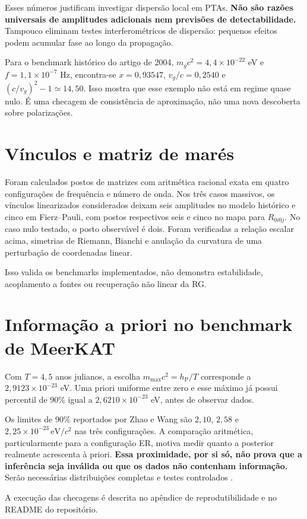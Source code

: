 Esses números justificam investigar dispersão local em PTAs. \textbf{Não
são razões universais de amplitudes adicionais nem previsões de
detectabilidade.} Tampouco eliminam testes interferométricos de
dispersão: pequenos efeitos podem acumular fase ao longo da propagação.

Para o benchmark histórico do artigo de 2004,
\(m_gc^2=4{,}4\times10^{-22}\) eV e \(f=1{,}1\times10^{-7}\) Hz,
encontra-se \(x=0{,}93547\), \(v_g/c=0{,}2540\) e
\((c/v_g)^2-1\simeq14{,}50\). Isso mostra que esse exemplo não está em
regime quase nulo. É uma checagem de consistência de aproximação, não
uma nova descoberta sobre polarizações.

\section{Vínculos e matriz de
marés}\label{vuxednculos-e-matriz-de-maruxe9s}

Foram calculados postos de matrizes com aritmética racional exata em
quatro configurações de frequência e número de onda. Nos três casos
massivos, os vínculos linearizados considerados deixam seis amplitudes
no modelo histórico e cinco em Fierz--Pauli, com postos respectivos seis
e cinco no mapa para \(R_{0i0j}\). No caso nulo testado, o posto
observável é dois. Foram verificadas a relação escalar acima, simetrias
de Riemann, Bianchi e anulação da curvatura de uma perturbação de
coordenadas linear.

Isso valida os benchmarks implementados, não demonstra estabilidade,
acoplamento a fontes ou recuperação não linear da RG.

\section{Informação a priori no benchmark de
MeerKAT}\label{informauxe7uxe3o-a-priori-no-benchmark-de-meerkat}

Com \(T=4{,}5\) anos julianos, a escolha \(m_{\max}c^2=h_{\mathrm P}/T\)
corresponde a \(2{,}9123\times10^{-23}\) eV. Uma priori uniforme entre
zero e esse máximo já possui percentil de 90\% igual a
\(2{,}6210\times10^{-23}\) eV, antes de observar dados.

Os limites de 90\% reportados por Zhao e Wang são \(2{,}10\), \(2{,}58\)
e \(2{,}25\times10^{-23}\,\mathrm{eV}/c^2\) nas três configurações. A
comparação aritmética, particularmente para a configuração ER, motiva
medir quanto a posterior realmente acrescenta à priori. \textbf{Essa
proximidade, por si só, não prova que a inferência seja inválida ou que
os dados não contenham informação.} Serão necessárias distribuições
completas e testes controlados \autocite{zhao2026}.

A execução das checagens é descrita no apêndice de reprodutibilidade e no README do
repositório.
